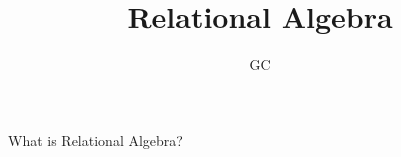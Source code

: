\documentclass{article}
\author{GC}
\title{Relational Algebra}
\begin{document}
\maketitle

What is Relational Algebra?
  
\end{document}
